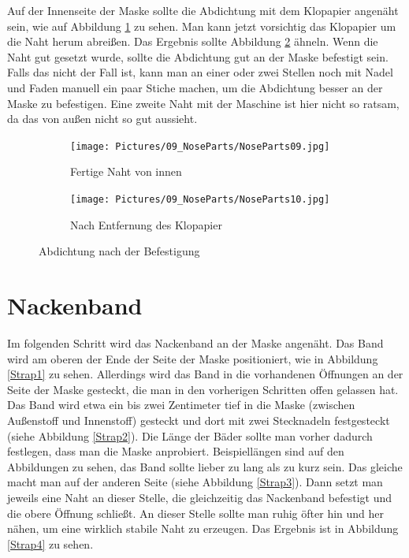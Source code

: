 \documentclass[12pt,parskip=full]{scrartcl}
\begin{document}
Auf der Innenseite der Maske sollte die Abdichtung mit dem Klopapier angenäht sein, wie auf Abbildung \ref{Nose09} zu sehen. Man kann jetzt vorsichtig das Klopapier um die Naht herum abreißen. Das Ergebnis sollte Abbildung \ref{Nose10} ähneln. Wenn die Naht gut gesetzt wurde, sollte die Abdichtung gut an der Maske befestigt sein. Falls das nicht der Fall ist, kann man an einer oder zwei Stellen noch mit Nadel und Faden manuell ein paar Stiche machen, um die Abdichtung besser an der Maske zu befestigen. Eine zweite Naht mit der Maschine ist hier nicht so ratsam, da das von außen nicht so gut aussieht. 

\begin{figure}[ht]
    \vspace{0.5cm}
    \centering
    \begin{subfigure}{0.48\textwidth}
        \centering
        \texttt{[image: Pictures/09\_NoseParts/NoseParts09.jpg]}
        \caption{Fertige Naht von innen}
        \label{Nose09}
    \end{subfigure}
    \begin{subfigure}{0.48\textwidth}
        \centering
        \texttt{[image: Pictures/09\_NoseParts/NoseParts10.jpg]}
        \caption{Nach Entfernung des Klopapier}
        \label{Nose10}
    \end{subfigure}
    \caption{Abdichtung nach der Befestigung}
    \label{NoseRes}
\end{figure}

\section{Nackenband}
Im folgenden Schritt wird das Nackenband an der Maske angenäht. Das Band wird am oberen der Ende der Seite der Maske positioniert, wie in Abbildung \ref{Strap1} zu sehen. Allerdings wird das Band in die vorhandenen Öffnungen an der Seite der Maske gesteckt, die man in den vorherigen Schritten offen gelassen hat. Das Band wird etwa ein bis zwei Zentimeter tief in die Maske (zwischen Außenstoff und Innenstoff) gesteckt und dort mit zwei Stecknadeln festgesteckt (siehe Abbildung \ref{Strap2}). Die Länge der Bäder sollte man vorher dadurch festlegen, dass man die Maske anprobiert. Beispiellängen sind auf den Abbildungen zu sehen, das Band sollte lieber zu lang als zu kurz sein. Das gleiche macht man auf der anderen Seite (siehe Abbildung \ref{Strap3}). Dann setzt man jeweils eine Naht an dieser Stelle, die gleichzeitig das Nackenband befestigt und die obere Öffnung schließt. An dieser Stelle sollte man ruhig öfter hin und her nähen, um eine wirklich stabile Naht zu erzeugen. Das Ergebnis ist in Abbildung \ref{Strap4} zu sehen. 
\end{document}

